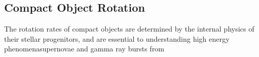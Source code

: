 {\color{orange}

\subsection{Compact Object Rotation}

The rotation rates of compact objects are determined by the internal physics of their stellar progenitors, and are essential to understanding high energy phenomenasupernovae and gamma ray bursts from 

}